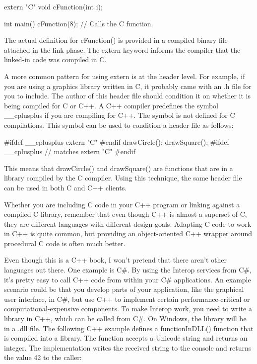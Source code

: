 \begin{cpp}
extern "C" {
    void cFunction(int i);
}

int main()
{
    cFunction(8); // Calls the C function.
}
\end{cpp}

The actual definition for cFunction() is provided in a compiled binary file attached in the link phase. The extern keyword informs the compiler that the linked-in code was compiled in C.

A more common pattern for using extern is at the header level. For example, if you are using a graphics library written in C, it probably came with an .h file for you to include. The author of this header file should condition it on whether it is being compiled for C or C++. A C++ compiler predefines the symbol \_\_cplusplus if you are compiling for C++. The symbol is not defined for C compilations. This symbol can be used to condition a header file as follows:

\begin{cpp}
#ifdef __cplusplus
    extern "C" {
#endif
        drawCircle();
        drawSquare();
#ifdef __cplusplus
    } // matches extern "C"
#endif
\end{cpp}

This means that drawCircle() and drawSquare() are functions that are in a library compiled by the C compiler. Using this technique, the same header file can be used in both C and C++ clients.

Whether you are including C code in your C++ program or linking against a compiled C library, remember that even though C++ is almost a superset of C, they are different languages with different design goals. Adapting C code to work in C++ is quite common, but providing an object-oriented C++ wrapper around procedural C code is often much better.


Even though this is a C++ book, I won’t pretend that there aren’t other languages out there. One example is C\#. By using the Interop services from C\#, it’s pretty easy to call C++ code from within your C\# applications. An example scenario could be that you develop parts of your application, like the graphical user interface, in C\#, but use C++ to implement certain performance-critical or computational-expensive components. To make Interop work, you need to write a library in C++, which can be called from C\#. On Windows, the library will be in a .dll file. The following C++ example defines a functionInDLL() function that is compiled into a library. The function accepts a Unicode string and returns an integer. The implementation writes the received string to the console and returns the value 42 to the caller:

